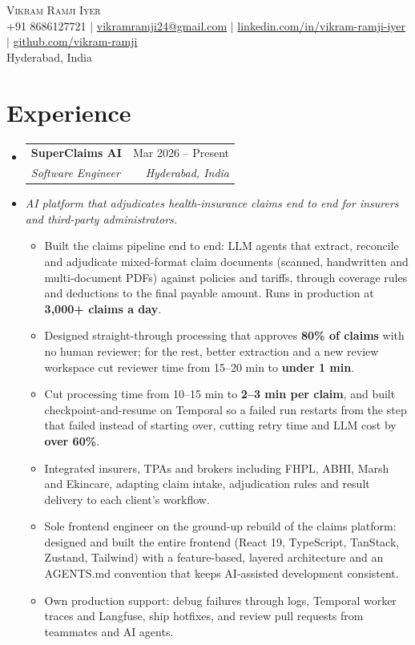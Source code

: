 \documentclass[letterpaper,10.5pt]{article}
\makeatletter
\newcommand{\resumeItem}[1]{\item\small{#1\vspace{-1pt}}}
\newcommand{\resumeSubheading}[4]{
  \vspace{-1pt}\item
    \begin{tabular*}{0.97\textwidth}[t]{l@{\extracolsep{\fill}}r}
      \textbf{#1} & #2 \\
      \textit{\small#3} & \textit{\small #4} \\
    \end{tabular*}\vspace{-6pt}
}
\newcommand{\resumeSubHeadingListStart}{\begin{itemize}[leftmargin=0.15in, label={}]}
\newcommand{\resumeSubHeadingListEnd}{\end{itemize}}
\newcommand{\resumeItemListStart}{\begin{itemize}[leftmargin=0.2in, itemsep=1.5pt]}
\newcommand{\resumeItemListEnd}{\end{itemize}\vspace{-4pt}}
\makeatother
\begin{document}
\begin{center}
    {\Huge \scshape Vikram Ramji Iyer} \\ \vspace{3pt}
    \small +91 8686127721 $|$ \href{mailto:vikramramji24@gmail.com}{vikramramji24@gmail.com} $|$
    \href{https://linkedin.com/in/vikram-ramji-iyer}{linkedin.com/in/vikram-ramji-iyer} $|$
    \href{https://github.com/vikram-ramji}{github.com/vikram-ramji} \\
    \small Hyderabad, India
\end{center}

\section{Experience}
\resumeSubHeadingListStart
  \resumeSubheading
    {SuperClaims AI}{Mar 2026 -- Present}
    {Software Engineer}{Hyderabad, India}
  \vspace{2pt}\item[] \small\textit{AI platform that adjudicates health-insurance claims end to end for insurers and third-party administrators.}\vspace{-4pt}
    \resumeItemListStart
      \resumeItem{Built the claims pipeline end to end: LLM agents that extract, reconcile and adjudicate mixed-format claim documents (scanned, handwritten and multi-document PDFs) against policies and tariffs, through coverage rules and deductions to the final payable amount. Runs in production at \textbf{3,000+ claims a day}.}
      \resumeItem{Designed straight-through processing that approves \textbf{80\% of claims} with no human reviewer; for the rest, better extraction and a new review workspace cut reviewer time from 15--20 min to \textbf{under 1 min}.}
      \resumeItem{Cut processing time from 10--15 min to \textbf{2--3 min per claim}, and built checkpoint-and-resume on Temporal so a failed run restarts from the step that failed instead of starting over, cutting retry time and LLM cost by \textbf{over 60\%}.}
      \resumeItem{Integrated insurers, TPAs and brokers including FHPL, ABHI, Marsh and Ekincare, adapting claim intake, adjudication rules and result delivery to each client's workflow.}
      \resumeItem{Sole frontend engineer on the ground-up rebuild of the claims platform: designed and built the entire frontend (React 19, TypeScript, TanStack, Zustand, Tailwind) with a feature-based, layered architecture and an AGENTS.md convention that keeps AI-assisted development consistent.}
      \resumeItem{Own production support: debug failures through logs, Temporal worker traces and Langfuse, ship hotfixes, and review pull requests from teammates and AI agents.}
    \resumeItemListEnd
\resumeSubHeadingListEnd
\end{document}
